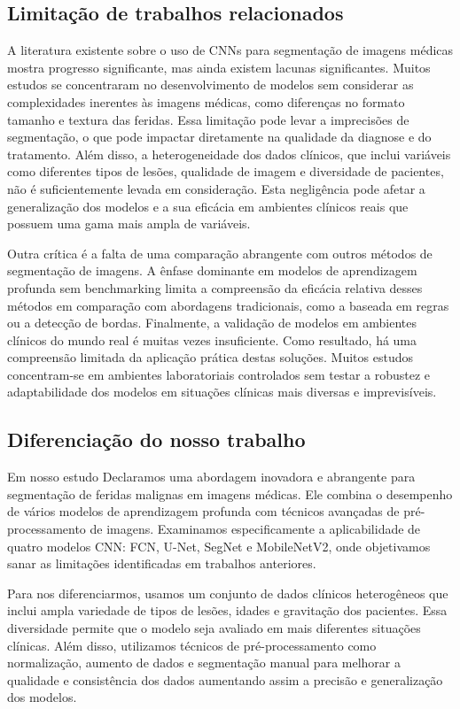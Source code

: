 \subsection{Limitação de trabalhos relacionados}

    A literatura existente sobre o uso de \ac{CNNs} para segmentação de imagens médicas mostra progresso significante, mas ainda existem lacunas significantes. Muitos estudos se concentraram no desenvolvimento de modelos sem considerar as complexidades inerentes às imagens médicas, como diferenças no formato tamanho e textura das feridas. Essa limitação pode levar a imprecisões de segmentação, o que pode impactar diretamente na qualidade da diagnose e do tratamento. Além disso, a heterogeneidade dos dados clínicos, que inclui variáveis como diferentes tipos de lesões, qualidade de imagem e diversidade de pacientes, não é suficientemente levada em consideração. Esta negligência pode afetar a generalização dos modelos e a sua eficácia em ambientes clínicos reais que possuem uma gama mais ampla de variáveis.

    Outra crítica é a falta de uma comparação abrangente com outros métodos de segmentação de imagens. A ênfase dominante em modelos de aprendizagem profunda sem benchmarking limita a compreensão da eficácia relativa desses métodos em comparação com abordagens tradicionais, como a baseada em regras ou a detecção de bordas. Finalmente, a validação de modelos em ambientes clínicos do mundo real é muitas vezes insuficiente. Como resultado, há uma compreensão limitada da aplicação prática destas soluções. Muitos estudos concentram-se em ambientes laboratoriais controlados sem testar a robustez e adaptabilidade dos modelos em situações clínicas mais diversas e imprevisíveis.

\subsection{Diferenciação do nosso trabalho} 

    Em nosso estudo Declaramos uma abordagem inovadora e abrangente para segmentação de feridas malignas em imagens médicas. Ele combina o desempenho de vários modelos de aprendizagem profunda com técnicos avançadas de pré-processamento de imagens. Examinamos especificamente a aplicabilidade de quatro modelos \ac{CNN}: \ac{FCN}, \ac{U-Net}, \ac{SegNet} e \ac{MobileNetV2}, onde objetivamos sanar as limitações identificadas em trabalhos anteriores.

    Para nos diferenciarmos, usamos um conjunto de dados clínicos heterogêneos que inclui ampla variedade de tipos de lesões, idades e gravitação dos pacientes. Essa diversidade permite que o modelo seja avaliado em mais diferentes situações clínicas. Além disso, utilizamos técnicos de pré-processamento como normalização, aumento de dados e segmentação manual para melhorar a qualidade e consistência dos dados aumentando assim a precisão e generalização dos modelos.

